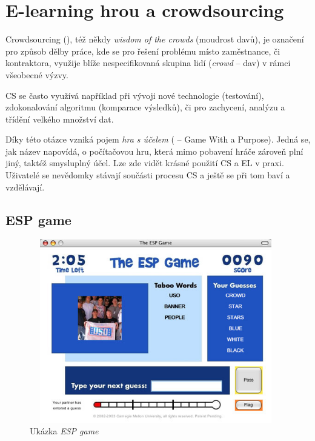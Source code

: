 \section{E-learning hrou a crowdsourcing}

Crowdsourcing (), též někdy {\sl wisdom of the crowds} (moudrost davů), je označení pro způsob dělby práce, kde se pro řešení problému místo zaměstnance, či kontraktora, využije blíže nespecifikovaná skupina lidí ({\sl crowd} -- dav) v rámci všeobecné výzvy.

CS se často využívá například při vývoji nové technologie (testování), zdokonalování algoritmu (komparace výsledků), či pro zachycení, analýzu a třídění velkého množství dat.

 \cite{ahn_2006}

Díky této otázce vzniká pojem {\sl hra s účelem} ( -- Game With a Purpose). Jedná se, jak název napovídá, o počítačovou hru, která mimo pobavení hráče zároveň plní jiný, taktéž smysluplný účel. Lze zde vidět krásné použití CS a EL v praxi. Uživatelé se nevědomky stávají součásti procesu CS a ještě se při tom baví a vzdělávají.

\subsection{ESP game}

\begin{figure}[h]
	\centering
	\includegraphics[width=110mm,height=80mm]{img/esp.jpg}
	\caption{Ukázka {\sl ESP game}}
	\label{fig:esp}
\end{figure}

